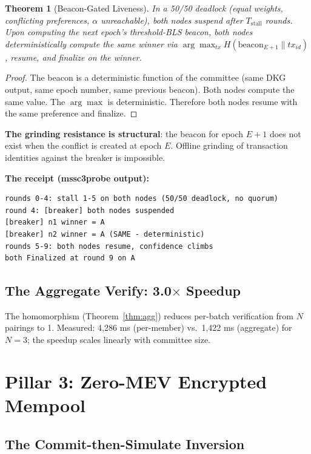 \documentclass[11pt, a4paper]{article}
\newtheorem{theorem}{Theorem}
\begin{document}
\begin{theorem}[Beacon-Gated Liveness]
\label{thm:beacon}
In a 50/50 deadlock (equal weights, conflicting preferences, $\alpha$ unreachable), both nodes suspend after $T_{\text{stall}}$ rounds. Upon computing the next epoch's threshold-BLS beacon, both nodes deterministically compute the same winner via $\arg\max_{tx} H(\text{beacon}_{E+1} \| tx_{id})$, resume, and finalize on the winner.
\end{theorem}
\begin{proof}
The beacon is a deterministic function of the committee (same DKG output, same epoch number, same previous beacon). Both nodes compute the same value. The $\arg\max$ is deterministic. Therefore both nodes resume with the same preference and finalize.
\end{proof}

\textbf{The grinding resistance is structural}: the beacon for epoch $E+1$ does not exist when the conflict is created at epoch $E$. Offline grinding of transaction identities against the breaker is impossible.

\textbf{The receipt (mssc3probe output):}
\begin{verbatim}
rounds 0-4: stall 1-5 on both nodes (50/50 deadlock, no quorum)
round 4: [breaker] both nodes suspended
[breaker] n1 winner = A
[breaker] n2 winner = A (SAME - deterministic)
rounds 5-9: both nodes resume, confidence climbs
both Finalized at round 9 on A
\end{verbatim}

\subsection{The Aggregate Verify: 3.0$\times$ Speedup}

The homomorphism (Theorem~\ref{thm:agg}) reduces per-batch verification from $N$ pairings to 1. Measured: 4{,}286 ms (per-member) vs.\ 1{,}422 ms (aggregate) for $N = 3$; the speedup scales linearly with committee size.

\section{Pillar 3: Zero-MEV Encrypted Mempool}

\subsection{The Commit-then-Simulate Inversion}
\end{document}
